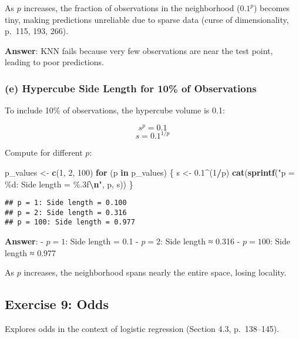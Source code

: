 \documentclass[
]{article}
\newenvironment{Shaded}{\begin{snugshade}}{\end{snugshade}}
\newcommand{\ControlFlowTok}[1]{\textcolor[rgb]{0.13,0.29,0.53}{\textbf{#1}}}
\newcommand{\DecValTok}[1]{\textcolor[rgb]{0.00,0.00,0.81}{#1}}
\newcommand{\FloatTok}[1]{\textcolor[rgb]{0.00,0.00,0.81}{#1}}
\newcommand{\FunctionTok}[1]{\textcolor[rgb]{0.13,0.29,0.53}{\textbf{#1}}}
\newcommand{\NormalTok}[1]{#1}
\newcommand{\OtherTok}[1]{\textcolor[rgb]{0.56,0.35,0.01}{#1}}
\newcommand{\SpecialCharTok}[1]{\textcolor[rgb]{0.81,0.36,0.00}{\textbf{#1}}}
\newcommand{\StringTok}[1]{\textcolor[rgb]{0.31,0.60,0.02}{#1}}
\begin{document}
As \(p\) increases, the fraction of observations in the neighborhood
(\(0.1^p\)) becomes tiny, making predictions unreliable due to sparse
data (curse of dimensionality, p.~115, 193, 266).

\textbf{Answer}: KNN fails because very few observations are near the
test point, leading to poor predictions.

\subsubsection{(e) Hypercube Side Length for 10\% of
Observations}\label{e-hypercube-side-length-for-10-of-observations}

To include 10\% of observations, the hypercube volume is 0.1:

\[ s^p = 0.1 \] \[ s = 0.1^{1/p} \]

Compute for different \(p\):

\begin{Shaded}
\begin{Highlighting}[]
\NormalTok{p\_values }\OtherTok{\textless{}{-}} \FunctionTok{c}\NormalTok{(}\DecValTok{1}\NormalTok{, }\DecValTok{2}\NormalTok{, }\DecValTok{100}\NormalTok{)}
\ControlFlowTok{for}\NormalTok{ (p }\ControlFlowTok{in}\NormalTok{ p\_values) \{}
\NormalTok{  s }\OtherTok{\textless{}{-}} \FloatTok{0.1}\SpecialCharTok{\^{}}\NormalTok{(}\DecValTok{1}\SpecialCharTok{/}\NormalTok{p)}
  \FunctionTok{cat}\NormalTok{(}\FunctionTok{sprintf}\NormalTok{(}\StringTok{"p = \%d: Side length = \%.3f}\SpecialCharTok{\textbackslash{}n}\StringTok{"}\NormalTok{, p, s))}
\NormalTok{\}}
\end{Highlighting}
\end{Shaded}

\begin{verbatim}
## p = 1: Side length = 0.100
## p = 2: Side length = 0.316
## p = 100: Side length = 0.977
\end{verbatim}

\textbf{Answer}: - \(p = 1\): Side length = 0.1 - \(p = 2\): Side length
≈ 0.316 - \(p = 100\): Side length ≈ 0.977

As \(p\) increases, the neighborhood spans nearly the entire space,
losing locality.

\subsection{Exercise 9: Odds}\label{exercise-9-odds}

Explores odds in the context of logistic regression (Section 4.3,
p.~138--145).
\end{document}
